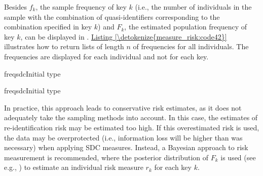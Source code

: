 \documentclass[letterpaper,10pt,english]{sphinxmanual}
\begin{document}
Besides \(f_{k}\), the sample frequency of key
\(k\) (i.e., the number of individuals in the sample with
the combination of quasi-identifiers corresponding to the combination
specified in key \(k\)) and \(F_{k}\), the estimated population
frequency of key \(k\), can be displayed in . \hyperref[\detokenize{measure_risk:code42}]{Listing \ref{\detokenize{measure_risk:code42}}}
illustrates how to return lists of length \(n\) of frequencies for all
individuals. The frequencies are displayed for each individual and not
for each key.

\def\sphinxLiteralBlockLabel{\label{\detokenize{measure_risk:code42}}}
%
\begin{sphinxVerbatim}[commandchars=\\\{\},numbers=left,firstnumber=1,stepnumber=1]
 freqsdcInitial type  
          

 freqsdcInitial type  
          
\end{sphinxVerbatim}

In practice, this approach leads to conservative risk estimates, as it
does not adequately take the sampling methods into account. In this
case, the estimates of re-identification risk may be estimated too high.
If this overestimated risk is used, the data may be overprotected (i.e.,
information loss will be higher than was necessary) when applying SDC
measures. Instead, a Bayesian approach to risk measurement is
recommended, where the posterior distribution of \(F_{k}\) is used
(see e.g., {\hyperref[\detokenize{measure_risk:hdfg12}]{}}) to estimate an individual risk
measure \(r_{k}\) for each key \(k\).
\end{document}
